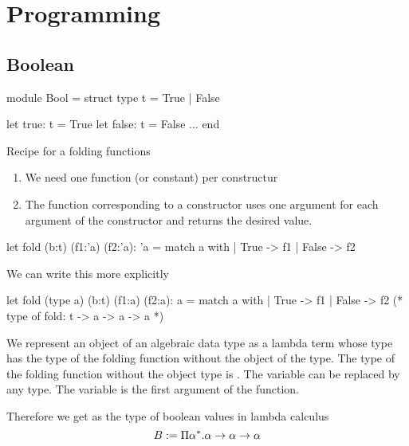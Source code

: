 \section{Programming}


\subsection{Boolean}

\begin{ocaml}
  module Bool =
    struct
      type t = True | False

      let true:  t = True
      let false: t = False
      ...
    end
\end{ocaml}

Recipe for a folding functions
%
\begin{enumerate}

\item We need one function (or constant) per constructur

\item The function corresponding to a constructor uses one argument for
  each argument of the constructor and returns the desired value.
\end{enumerate}

\begin{ocaml}
  let fold (b:t) (f1:'a) (f2:'a): 'a =
     match a with
     | True -> f1
     | False -> f2
\end{ocaml}

We can write this more explicitly

\begin{ocaml}
  let fold (type a) (b:t) (f1:a) (f2:a): a =
     match a with
     | True -> f1
     | False -> f2
  (* type of fold: t -> a -> a -> a *)
\end{ocaml}


We represent an object of an algebraic data type as a lambda term whose type
has the type of the folding function without the object of the type. The type
of the folding function without the object type is . The
variable  can be replaced by any type. The variable  is the
first argument of the function.


Therefore we get as the type of boolean values in lambda calculus
$$
    B := \Pi \alpha^*. \alpha \to \alpha \to \alpha
$$


